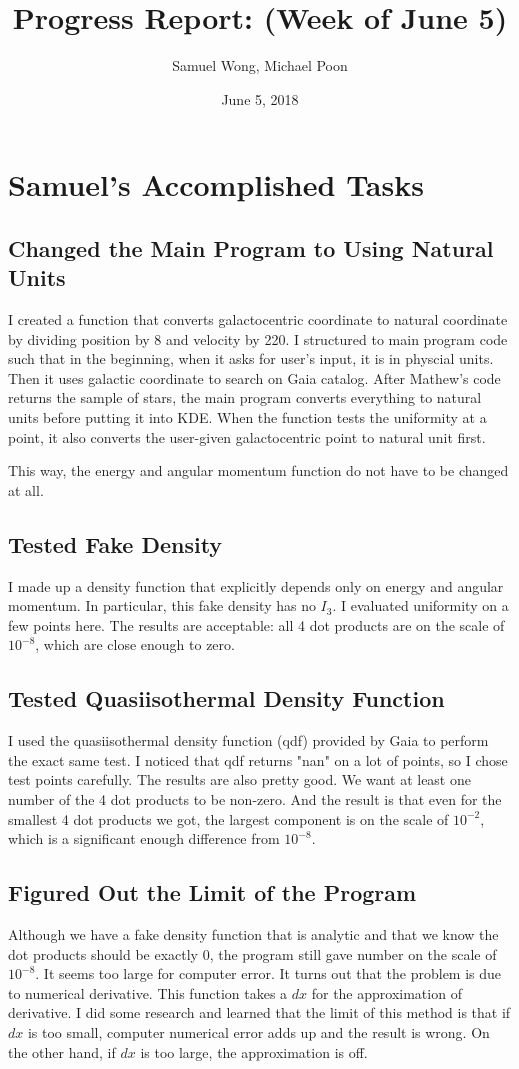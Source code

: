\documentclass[12pt]{article}
\begin{document}
\title{Progress Report: (Week of June 5)}
\author{Samuel Wong, Michael Poon}
\date{June 5, 2018}
\maketitle


\section{Samuel's Accomplished Tasks}
\subsection{Changed the Main Program to Using Natural Units}
I created a function that converts galactocentric coordinate to natural coordinate by dividing position by 8 and velocity by 220. I structured to main program code such that in the beginning, when it asks for user's input, it is in physcial units. Then it uses galactic coordinate to search on Gaia catalog. After Mathew's code returns the sample of stars, the main program converts everything to natural units before putting it into KDE. When the function tests the uniformity at a point, it also converts the user-given galactocentric point to natural unit first.

This way, the energy and angular momentum function do not have to be changed at all.
\subsection{Tested Fake Density}
I made up a density function that explicitly depends only on energy and angular momentum. In particular, this fake density has no $I_3$. I evaluated uniformity on a few points here. The results are acceptable: all 4 dot products are on the scale of $10^{-8}$, which are close enough to zero.
\subsection{Tested Quasiisothermal Density Function}
I used the quasiisothermal density function (qdf) provided by Gaia to perform the exact same test. I noticed that qdf returns "nan" on a lot of points, so I chose test points carefully. The results are also pretty good. We want at least one number of the 4 dot products to be non-zero. And the result is that even for the smallest 4 dot products we got, the largest component is on the scale of $10^{-2}$, which is a significant enough difference from $10^{-8}$.
\subsection{Figured Out the Limit of the Program}
Although we have a fake density function that is analytic and that we know the dot products should be exactly 0, the program still gave number on the scale of $10^{-8}$. It seems too large for computer error. It turns out that the problem is due to numerical derivative. This function takes a $dx$ for the approximation of derivative. I did some research and learned that the limit of this method is that if $dx$ is too small, computer numerical error adds up and the result is wrong. On the other hand, if $dx$ is too large, the approximation is off.
\end{document}
